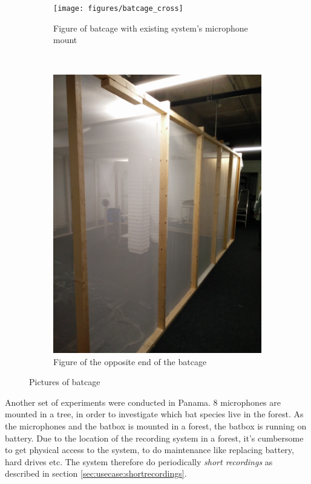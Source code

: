 \begin{figure}[!h]
    \centering
    \begin{subfigure}[b]{0.45\textwidth}
        \texttt{[image: figures/batcage\_cross]}
        \caption{Figure of batcage with existing system's microphone mount}
        \label{fig:gull}
    \end{subfigure}
    ~ %
    \begin{subfigure}[b]{0.45\textwidth}
        \includegraphics[width=\textwidth]{figures/batcage}
        \caption{Figure of the opposite end of the batcage}
        \label{fig:mouse}
    \end{subfigure}
    \caption{Pictures of batcage}\label{fig:usecase:batcage}
\end{figure}

Another set of experiments were conducted in Panama. 8 microphones are mounted in a tree, in order to investigate which bat species live in the forest. As the microphones and the batbox is mounted in a forest, the batbox is running on battery. Due to the location of the recording system in a forest, it's cumbersome to get physical access to the system, to do maintenance like replacing battery, hard drives etc. The system therefore do periodically \textit{short recordings} as described in section \ref{sec:usecase:shortrecordings}. 

